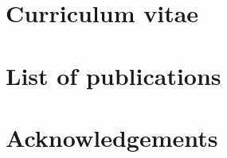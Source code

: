 \renewcommand{\bibpreamble}{}
\renewcommand{\bibpostamble}{}
\renewcommand\bibfont{\normalfont\fontsize{8.58}{8}\selectfont}

 \label{ch-6}
\clearpage
\section{Curriculum vitae}
\clearpage
\section{List of publications}
\nocite{*}


\clearpage
\section{Acknowledgements}
